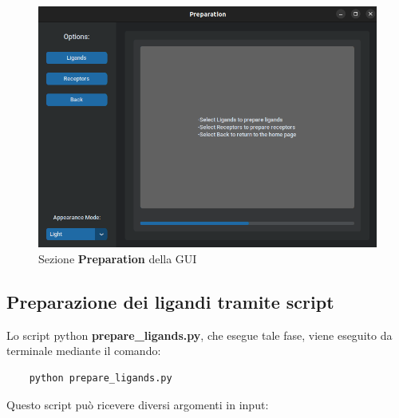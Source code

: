 \begin{figure}[H]
    \centering
    \includegraphics[scale=0.6]{immagini/preparation.png}
    \caption{Sezione \textbf{Preparation} della GUI}
    \label{fig:preparation}
\end{figure}

\subsection{Preparazione dei ligandi tramite script}\label{sec:3.4.1}
Lo script python \textbf{prepare\_ligands.py}, che esegue tale fase, viene eseguito da terminale mediante il comando:

\begin{verbatim}
    python prepare_ligands.py
\end{verbatim}

Questo script può ricevere diversi argomenti in input:

